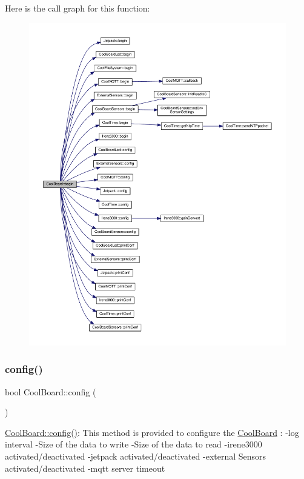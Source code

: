 Here is the call graph for this function\+:
\nopagebreak
\begin{figure}[H]
\begin{center}
\leavevmode
\includegraphics[width=350pt]{class_cool_board_acba7c5aef7268b2c0044bdb54d3b9d76_cgraph}
\end{center}
\end{figure}
\mbox{\label{class_cool_board_a583a874c09c07e70a6eb9229fc4beddb}} 
\subsubsection{\texorpdfstring{config()}{config()}}
{\footnotesize\ttfamily bool Cool\+Board\+::config (\begin{DoxyParamCaption}{ }\end{DoxyParamCaption})}

\hyperlink{class_cool_board_a583a874c09c07e70a6eb9229fc4beddb}{Cool\+Board\+::config()}\+: This method is provided to configure the \hyperlink{class_cool_board}{Cool\+Board} \+: -\/log interval -\/\+Size of the data to write -\/\+Size of the data to read -\/irene3000 activated/deactivated -\/jetpack activated/deactivated -\/external Sensors activated/deactivated -\/mqtt server timeout

